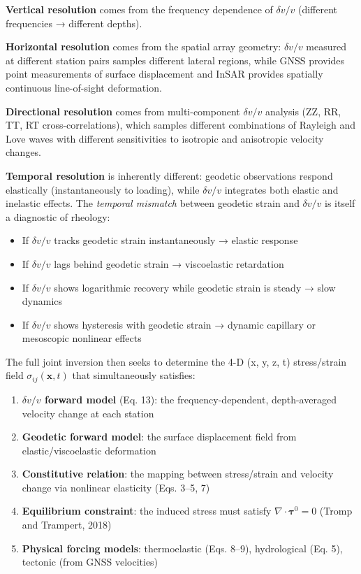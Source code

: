 \documentclass[draft]{agujournal2019}
\providecommand{\tightlist}{%
  \setlength{\itemsep}{0pt}\setlength{\parskip}{0pt}}
\begin{document}
\textbf{Vertical resolution} comes from the frequency dependence of
\(\delta v/v\) (different frequencies → different depths).

\textbf{Horizontal resolution} comes from the spatial array geometry:
\(\delta v/v\) measured at different station pairs samples different
lateral regions, while GNSS provides point measurements of surface
displacement and InSAR provides spatially continuous line-of-sight
deformation.

\textbf{Directional resolution} comes from multi-component
\(\delta v/v\) analysis (ZZ, RR, TT, RT cross-correlations), which
samples different combinations of Rayleigh and Love waves with different
sensitivities to isotropic and anisotropic velocity changes.

\textbf{Temporal resolution} is inherently different: geodetic
observations respond elastically (instantaneously to loading), while
\(\delta v/v\) integrates both elastic and inelastic effects. The
\emph{temporal mismatch} between geodetic strain and \(\delta v/v\) is
itself a diagnostic of rheology:

\begin{itemize}
\tightlist
\item
  If \(\delta v/v\) tracks geodetic strain instantaneously → elastic
  response
\item
  If \(\delta v/v\) lags behind geodetic strain → viscoelastic
  retardation
\item
  If \(\delta v/v\) shows logarithmic recovery while geodetic strain is
  steady → slow dynamics
\item
  If \(\delta v/v\) shows hysteresis with geodetic strain → dynamic
  capillary or mesoscopic nonlinear effects
\end{itemize}

The full joint inversion then seeks to determine the 4-D (x, y, z, t)
stress/strain field \(\sigma_{ij}(\mathbf{x}, t)\) that simultaneously
satisfies:

\begin{enumerate}
\def\labelenumi{\arabic{enumi}.}
\tightlist
\item
  \textbf{\(\delta v/v\) forward model} (Eq. 13): the
  frequency-dependent, depth-averaged velocity change at each station
\item
  \textbf{Geodetic forward model}: the surface displacement field from
  elastic/viscoelastic deformation
\item
  \textbf{Constitutive relation}: the mapping between stress/strain and
  velocity change via nonlinear elasticity (Eqs. 3--5, 7)
\item
  \textbf{Equilibrium constraint}: the induced stress must satisfy
  \(\nabla \cdot \boldsymbol{\tau}^0 = 0\) (Tromp and Trampert, 2018)
\item
  \textbf{Physical forcing models}: thermoelastic (Eqs. 8--9),
  hydrological (Eq. 5), tectonic (from GNSS velocities)
\end{enumerate}
\end{document}
